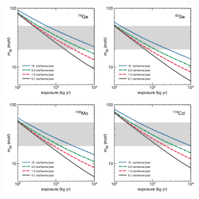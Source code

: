 \documentclass{PoS}
\begin{document}
\begin{figure}
\centering
\includegraphics[width=0.45\textwidth]{img/FutureGe76.pdf}
\includegraphics[width=0.45\textwidth]{img/FutureSe82.pdf}
\includegraphics[width=0.45\textwidth]{img/FutureMo100.pdf}
\includegraphics[width=0.45\textwidth]{img/FutureCd116.pdf}

\end{figure}
\end{document}
